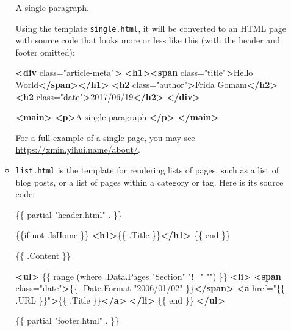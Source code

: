 \documentclass[12pt,]{krantz}
\makeatletter
\newenvironment{Shaded}{\begin{snugshade}}{\end{snugshade}}
\newcommand{\KeywordTok}[1]{\textcolor[rgb]{0.13,0.29,0.53}{\textbf{#1}}}
\newcommand{\NormalTok}[1]{#1}
\newcommand{\OtherTok}[1]{\textcolor[rgb]{0.56,0.35,0.01}{#1}}
\newcommand{\StringTok}[1]{\textcolor[rgb]{0.31,0.60,0.02}{#1}}
\newenvironment{kframe}{%
\medskip{}
\setlength{\fboxsep}{.8em}
 \def\at@end@of@kframe{}%
 \ifinner\ifhmode%
  \def\at@end@of@kframe{\end{minipage}}%
  \begin{minipage}{\columnwidth}%
 \fi\fi%
 \def\FrameCommand##1{\hskip\@totalleftmargin \hskip-\fboxsep
 \colorbox{shadecolor}{##1}\hskip-\fboxsep
     \hskip-\linewidth \hskip-\@totalleftmargin \hskip\columnwidth}%
 \MakeFramed {\advance\hsize-\width
   \@totalleftmargin\z@ \linewidth\hsize
   \@setminipage}}%
 {\par\unskip\endMakeFramed%
 \at@end@of@kframe}
\renewenvironment{Shaded}{\begin{kframe}}{\end{kframe}}
\theoremstyle{definition}
\theoremstyle{definition}
\theoremstyle{definition}
\theoremstyle{remark}
\makeatother
\begin{document}
\begin{itemize}
\begin{itemize}
\begin{Shaded}
\begin{Highlighting}[]
\NormalTok{A single paragraph.}
\end{Highlighting}
\end{Shaded}

    Using the template \texttt{single.html}, it will be converted to an
    HTML page with source code that looks more or less like this (with
    the header and footer omitted):

\begin{Shaded}
\begin{Highlighting}[]
\KeywordTok{<div}\OtherTok{ class=}\StringTok{"article-meta"}\KeywordTok{>}
  \KeywordTok{<h1><span}\OtherTok{ class=}\StringTok{"title"}\KeywordTok{>}\NormalTok{Hello World}\KeywordTok{</span></h1>}
  \KeywordTok{<h2}\OtherTok{ class=}\StringTok{"author"}\KeywordTok{>}\NormalTok{Frida Gomam}\KeywordTok{</h2>}
  \KeywordTok{<h2}\OtherTok{ class=}\StringTok{"date"}\KeywordTok{>}\NormalTok{2017/06/19}\KeywordTok{</h2>}
\KeywordTok{</div>}

\KeywordTok{<main>}
  \KeywordTok{<p>}\NormalTok{A single paragraph.}\KeywordTok{</p>}
\KeywordTok{</main>}
\end{Highlighting}
\end{Shaded}

    For a full example of a single page, you may see
    \url{https://xmin.yihui.name/about/}.
  \item
    \texttt{list.html} is the template for rendering
    lists of pages, such as a list of blog posts, or a list of pages
    within a category or tag. Here is its source code:

\begin{Shaded}
\begin{Highlighting}[]
\NormalTok{\{\{ partial "header.html" . \}\}}

\NormalTok{\{\{if not .IsHome \}\}}
\KeywordTok{<h1>}\NormalTok{\{\{ .Title \}\}}\KeywordTok{</h1>}
\NormalTok{\{\{ end \}\}}

\NormalTok{\{\{ .Content \}\}}

\KeywordTok{<ul>}
\NormalTok{  \{\{ range (where .Data.Pages "Section" "!=" "") \}\}}
  \KeywordTok{<li>}
    \KeywordTok{<span}\OtherTok{ class=}\StringTok{"date"}\KeywordTok{>}\NormalTok{\{\{ .Date.Format "2006/01/02" \}\}}\KeywordTok{</span>}
    \KeywordTok{<a}\OtherTok{ href=}\StringTok{"\{\{ .URL \}\}"}\KeywordTok{>}\NormalTok{\{\{ .Title \}\}}\KeywordTok{</a>}
  \KeywordTok{</li>}
\NormalTok{  \{\{ end \}\}}
\KeywordTok{</ul>}

\NormalTok{\{\{ partial "footer.html" . \}\}}
\end{Highlighting}
\end{Shaded}


\end{itemize}
\end{itemize}
\end{document}
